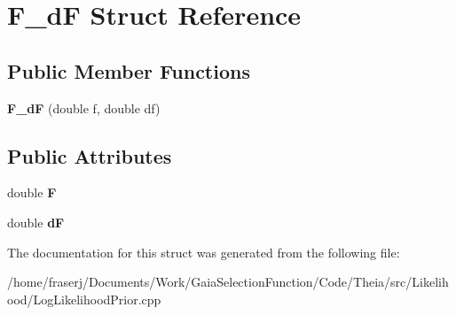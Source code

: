 \hypertarget{structF__dF}{}\section{F\+\_\+dF Struct Reference}
\label{structF__dF}
\subsection*{Public Member Functions}
\begin{DoxyCompactItemize}
\item 
\mbox{\label{structF__dF_a203b61bb3af93c149d1b13d8e1865940}} 
{\bfseries F\+\_\+dF} (double f, double df)
\end{DoxyCompactItemize}
\subsection*{Public Attributes}
\begin{DoxyCompactItemize}
\item 
\mbox{\label{structF__dF_a1989c3db31ab6428238f4145e4e0f311}} 
double {\bfseries F}
\item 
\mbox{\label{structF__dF_ac0e2417c721948dafc6db9535a824a2b}} 
double {\bfseries dF}
\end{DoxyCompactItemize}


The documentation for this struct was generated from the following file\+:\begin{DoxyCompactItemize}
\item 
/home/fraserj/\+Documents/\+Work/\+Gaia\+Selection\+Function/\+Code/\+Theia/src/\+Likelihood/Log\+Likelihood\+Prior.\+cpp\end{DoxyCompactItemize}
